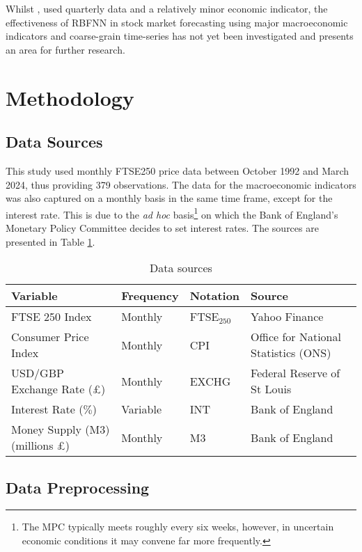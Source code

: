 \documentclass[11pt,a4paper]{article}
\newcommand{\citeboth}[1]{\citeauthor{#1} \citep{#1}}
\begin{document}
Whilst \citeboth{abotaleb2024}, used quarterly data and a relatively minor economic indicator, the effectiveness of RBFNN in stock market forecasting using 
major macroeconomic indicators and coarse-grain time-series has not yet been investigated and presents an area for further 
research. 

\section{Methodology}
\label{sec:meth}

\subsection{Data Sources}

This study used monthly FTSE250 price data between October 1992 and March 2024,
thus providing 379 observations. The data for the macroeconomic indicators 
was also captured on a monthly basis in the same time frame, except for the 
interest rate. This is due to the
\textit{ad hoc} 
basis\footnote{The MPC typically meets roughly every six weeks, however, in uncertain economic 
conditions it may convene far more frequently.} on which the
Bank of England's Monetary Policy 
Committee decides to set interest rates. The sources 
are presented in Table \ref{table: tabl}.

\begin{table}[h!]
    \centering
    \caption{Data sources}
    \label{table: tabl}
    \begin{tabular}{llll}
        \toprule
        \textbf{Variable} & \textbf{Frequency} & \textbf{Notation} & \textbf{Source} \\
        \midrule
        FTSE 250 Index & Monthly & FTSE$_{250}$ & Yahoo Finance \\
        Consumer Price Index & Monthly & CPI & Office for National Statistics (ONS) \\
        USD/GBP Exchange Rate (£) & Monthly & EXCHG & Federal Reserve of St Louis \\
        Interest Rate ($\%$) & Variable & INT & Bank of England \\
        Money Supply (M3) (millions £) & Monthly & M3 & Bank of England \\
        \bottomrule
    \end{tabular}
\end{table}



\subsection{Data Preprocessing}
\label{section: prep}
\end{document}

